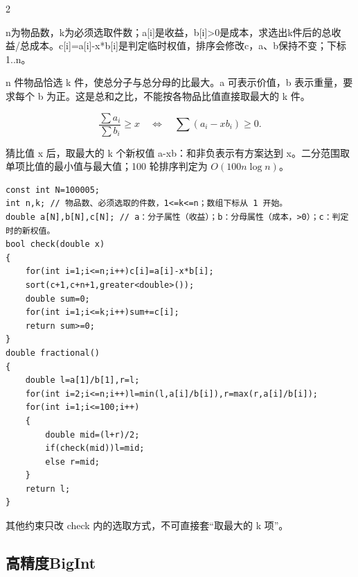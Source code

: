 \documentclass[UTF8,fontset=fandol,a4paper,twoside]{ctexart}
\newcommand{\note}[1]{{\fontsize{10}{12}\selectfont #1\par}}
\begin{document}
\begin{multicols}{2}
\note{n为物品数，k为必须选取件数；a[\allowbreak{}i]\allowbreak{}是收益，b[\allowbreak{}i]\allowbreak{}>\allowbreak{}0是成本，求选出k件后的总收益/\allowbreak{}总成本。c[\allowbreak{}i]\allowbreak{}=\allowbreak{}a[\allowbreak{}i]\allowbreak{}-\allowbreak{}x*b[\allowbreak{}i]\allowbreak{}是判定临时权值，排序会修改c，a、b保持不变；下标1.\allowbreak{}.\allowbreak{}n。}
\note{n 件物品恰选 k 件，使总分子与总分母的比最大。a 可表示价值，b 表示重量，要求每个 b 为正。这是总和之比，不能按各物品比值直接取最大的 k 件。}\[\frac{\sum a_i}{\sum b_i}\ge x\quad\Longleftrightarrow\quad\sum(a_i-xb_i)\ge0.\]\note{猜比值 x 后，取最大的 k 个新权值 a-xb：和非负表示有方案达到 x。二分范围取单项比值的最小值与最大值；100 轮排序判定为 $O(100n\log n)$。}
\begin{lstlisting}
const int N=100005;
int n,k; // 物品数、必须选取的件数，1<=k<=n；数组下标从 1 开始。
double a[N],b[N],c[N]; // a：分子属性（收益）；b：分母属性（成本，>0）；c：判定时的新权值。
bool check(double x)
{
    for(int i=1;i<=n;i++)c[i]=a[i]-x*b[i];
    sort(c+1,c+n+1,greater<double>());
    double sum=0;
    for(int i=1;i<=k;i++)sum+=c[i];
    return sum>=0;
}
double fractional()
{
    double l=a[1]/b[1],r=l;
    for(int i=2;i<=n;i++)l=min(l,a[i]/b[i]),r=max(r,a[i]/b[i]);
    for(int i=1;i<=100;i++)
    {
        double mid=(l+r)/2;
        if(check(mid))l=mid;
        else r=mid;
    }
    return l;
}
\end{lstlisting}
\note{其他约束只改 check 内的选取方式，不可直接套“取最大的 k 项”。}
\subsection{高精度BigInt}


\end{multicols}
\end{document}
